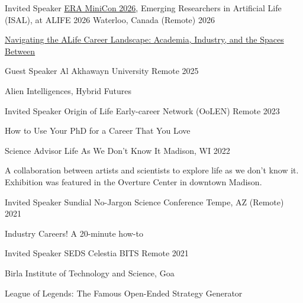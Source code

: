 
\begin{cventries}

\cventry
    {Invited Speaker}
    {\href{https://emergingresearchers.life}{ERA MiniCon 2026}, Emerging Researchers in Artificial Life (ISAL), at ALIFE 2026}
    {Waterloo, Canada (Remote)}
    {2026}
    {
      \begin{cvitems}
        \item {\href{https://www.youtube.com/watch?v=TPZyfAIni6I}{Navigating the ALife Career Landscape: Academia, Industry, and the Spaces Between}}
      \end{cvitems}
    }

\cventry
    {Guest Speaker}
    {Al Akhawayn University}
    {Remote}
    {2025}
    {
      \begin{cvitems}
        \item {Alien Intelligences, Hybrid Futures}
      \end{cvitems}
    }

\cventry
    {Invited Speaker}
    {Origin of Life Early-career Network (OoLEN)}
    {Remote}
    {2023}
    {
      \begin{cvitems}
        \item {How to Use Your PhD for a Career That You Love}
      \end{cvitems}
    }

\cventry
    {Science Advisor}
    {Life As We Don't Know It}
    {Madison, WI}
    {2022}
    {\begin{cvitems}
        \item {A collaboration between artists and scientists to explore life as we don't know it. Exhibition was featured in the Overture Center in downtown Madison.}
      \end{cvitems}}

\cventry
    {Invited Speaker}
    {Sundial No-Jargon Science Conference}
    {Tempe, AZ (Remote)}
    {2021}
    {\begin{cvitems}
        \item {Industry Careers! A 20-minute how-to}
      \end{cvitems}}

\cventry
    {Invited Speaker}
    {SEDS Celestia BITS}
    {Remote}
    {2021}
    {\begin{cvitems}
        \item {Birla Institute of Technology and Science, Goa}
        \item {League of Legends: The Famous Open-Ended Strategy Generator}
      \end{cvitems}}


\end{cventries}
